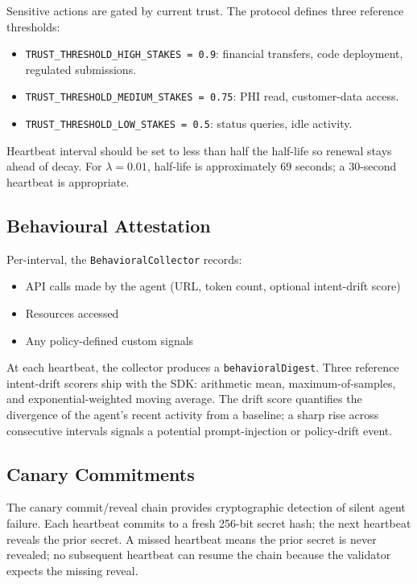 \documentclass[11pt,a4paper,twocolumn]{article}
\begin{document}
Sensitive actions are gated by current trust. The protocol defines three reference thresholds:

\begin{itemize}[leftmargin=*]
\item \verb|TRUST_THRESHOLD_HIGH_STAKES = 0.9|: financial transfers, code deployment, regulated submissions.
\item \verb|TRUST_THRESHOLD_MEDIUM_STAKES = 0.75|: PHI read, customer-data access.
\item \verb|TRUST_THRESHOLD_LOW_STAKES = 0.5|: status queries, idle activity.
\end{itemize}

Heartbeat interval should be set to less than half the half-life so renewal stays ahead of decay. For $\lambda = 0.01$, half-life is approximately 69 seconds; a 30-second heartbeat is appropriate.

\subsection{Behavioural Attestation}

Per-interval, the \verb|BehavioralCollector| records:

\begin{itemize}[leftmargin=*]
\item API calls made by the agent (URL, token count, optional intent-drift score)
\item Resources accessed
\item Any policy-defined custom signals
\end{itemize}

At each heartbeat, the collector produces a \verb|behavioralDigest|. Three reference intent-drift scorers ship with the SDK: arithmetic mean, maximum-of-samples, and exponential-weighted moving average. The drift score quantifies the divergence of the agent's recent activity from a baseline; a sharp rise across consecutive intervals signals a potential prompt-injection or policy-drift event.

\subsection{Canary Commitments}

The canary commit/reveal chain provides cryptographic detection of silent agent failure. Each heartbeat commits to a fresh 256-bit secret hash; the next heartbeat reveals the prior secret. A missed heartbeat means the prior secret is never revealed; no subsequent heartbeat can resume the chain because the validator expects the missing reveal.
\end{document}
